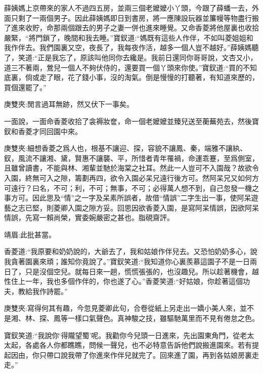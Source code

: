 \begin{parag}
    薛姨媽上京帶來的家人不過四五房，並兩三個老嬤嬤小丫頭，今跟了薛蟠一去，外面只剩了一兩個男子。因此薛姨媽即日到書房，將一應陳設玩器並簾幔等物盡行搬了進來收貯，命那兩個跟去的男子之妻一併也進來睡覺。又命香菱將他屋裏也收拾嚴緊，“將門鎖了，晚間和我去睡。”寶釵道:“媽既有這些人作伴，不如叫菱姐姐和我作伴去。我們園裏又空，夜長了，我每夜作活，越多一個人豈不越好。”薛姨媽聽了，笑道:“正是我忘了，原該叫他同你去纔是。我前日還同你哥哥說，文杏又小，道三不著兩，鶯兒一個人不夠伏侍的，還要買一個丫頭來你使。”寶釵道:“買的不知底裏，倘或走了眼，花了錢小事，沒的淘氣。倒是慢慢的打聽著，有知道來歷的，買個還罷了。”\begin{note}庚雙夾:閒言過耳無跡，然又伏下一事矣。\end{note}一面說，一面命香菱收拾了衾褥妝奩，命一個老嬤嬤並臻兒送至蘅蕪苑去，然後寶釵和香菱才同回園中來。\begin{note}庚雙夾:細想香菱之爲人也，根基不讓迎、探，容貌不讓鳳、秦，端雅不讓紈、釵，風流不讓湘、黛，賢惠不讓襲、平，所惜者青年罹禍，命運乖蹇，至爲側室，且雖曾讀書，不能與林、湘輩並馳於海棠之社耳。然此一人豈可不入園哉？故欲令入園，終無可入之隙，籌劃再四，欲令入園必呆兄遠行後方可。然阿呆兄又如何方可遠行？曰名，不可；利，不可；無事，不可；必得萬人想不到，自己忽發一機之事方可。因此思及“情”之一字及呆素所誤者，故借“情誤”二字生出一事，使阿呆遊藝之志已堅，則菱卿入園之隙方妥。回思因欲香菱入園，是寫阿呆情誤，因欲阿呆情誤，先寫一賴尚榮，實委婉嚴密之甚也。脂硯齋評。\end{note}\begin{note}靖眉:此批甚當。\end{note}
\end{parag}


\begin{parag}
    香菱道:“我原要和奶奶說的，大爺去了，我和姑娘作伴兒去。又恐怕奶奶多心，說我貪著園裏來頑；誰知你竟說了。”寶釵笑道:“我知道你心裏羨慕這園子不是一日兩日了，只是沒個空兒。就每日來一趟，慌慌張張的，也沒趣兒。所以趁著機會，越性住上一年，我也多個作伴的，你也遂了心。”香菱笑道:“好姑娘，你趁著這個功夫，教給我作詩罷。”\begin{note}庚雙夾:寫得何其有趣，今忽見菱卿此句，合卷從紙上另走出一嬌小美人來，並不是湘、林、探、鳳等一樣口氣聲色。真神駿之技，雖驅馳萬里而不見有倦怠之色。\end{note}寶釵笑道:“我說你‘得隴望蜀’呢。我勸你今兒頭一日進來，先出園東角門，從老太太起，各處各人你都瞧瞧，問候一聲兒，也不必特意告訴他們說搬進園來。若有提起因由，你只帶口說我帶了你進來作伴兒就完了。回來進了園，再到各姑娘房裏走走。”
\end{parag}


